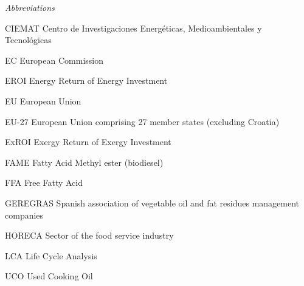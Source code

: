 \documentclass[sustainability,article,submit,moreauthors,pdftex,12pt,a4paper]{mdpi}
\begin{document}
\noindent\emph{Abbreviations}
\begin{list}{}{
	\renewcommand*{\makelabel}[1]{\hspace{\labelsep}\raggedleft #1}
    \setlength{\labelwidth}{6em}
    \setlength{\leftmargin}{\labelwidth}
    \setlength{\parsep}{0pt}
    \setlength{\itemsep}{0pt}
    \sloppy}
    \item[CIEMAT] Centro de Investigaciones Energ\'eticas, Medioambientales y Tecnol\'ogicas
    \item[EC] European Commission
    \item[EROI] Energy Return of Energy Investment
    \item[EU] European Union
    \item[EU-27] European Union comprising 27 member states (excluding Croatia)
    \item[ExROI] Exergy Return of Exergy Investment
    \item[FAME] Fatty Acid Methyl ester (biodiesel)
    \item[FFA] Free Fatty Acid
    \item[GEREGRAS] Spanish association of vegetable oil and fat residues management companies
    \item[HORECA] Sector of the food service industry
    \item[LCA] Life Cycle Analysis
    \item[UCO] Used Cooking Oil
\end{list}
\end{document}
